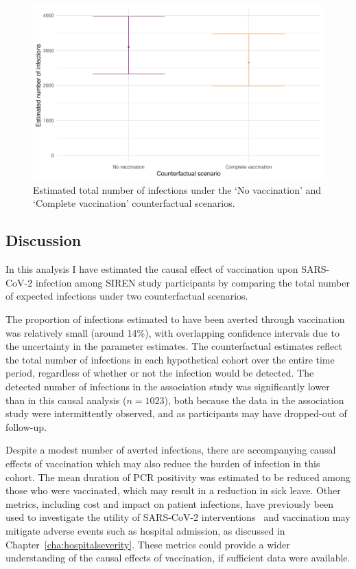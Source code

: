 \begin{figure}[htbp!]
    \centering
    \includegraphics[width=\textwidth]{ppass_causal_msm.pdf}
    \caption[Estimated total number of infections under the `No vaccination' and `Complete vaccination' counterfactual scenarios]{Estimated total number of infections under the `No vaccination' and `Complete vaccination' counterfactual scenarios.}\label{fig:passage-probs}
\end{figure}

\subsection{Discussion}

In this analysis I have estimated the causal effect of vaccination upon SARS-CoV-2 infection among SIREN study participants by comparing the total number of expected infections under two counterfactual scenarios.

The proportion of infections estimated to have been averted through vaccination was relatively small (around 14\%), with overlapping confidence intervals due to the uncertainty in the parameter estimates. The counterfactual estimates reflect the total number of infections in each hypothetical cohort over the entire time period, regardless of whether or not the infection would be detected. The detected number of infections in the association study was significantly lower than in this causal analysis ($n = 1023$), both because the data in the association study were intermittently observed, and as participants may have dropped-out of follow-up.

Despite a modest number of averted infections, there are accompanying causal effects of vaccination which may also reduce the burden of infection in this cohort. The mean duration of PCR positivity was estimated to be reduced among those who were vaccinated, which may result in a reduction in sick leave. Other metrics, including cost and impact on patient infections, have previously been used to investigate the utility of SARS-CoV-2 interventions~\parencite{Heath2023-af} and vaccination may mitigate adverse events such as hospital admission, as discussed in Chapter~\ref{cha:hospitalseverity}. These metrics could provide a wider understanding of the causal effects of vaccination, if sufficient data were available.

